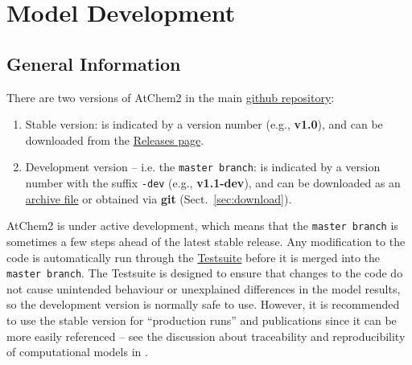 %
%
%
%

\chapter{Model Development} \label{ch:development}

\section{General Information} \label{sec:general-information}

There are two versions of AtChem2 in the main
\href{https://github.com/AtChem/AtChem2}{github repository}:

\begin{enumerate}
\item Stable version: is indicated by a version number (e.g.,
  \textbf{v1.0}), and can be downloaded from the
  \href{https://github.com/AtChem/AtChem2/releases}{Releases page}.
\item Development version -- i.e. the \texttt{master\ branch}: is
  indicated by a version number with the suffix \texttt{-dev} (e.g.,
  \textbf{v1.1-dev}), and can be downloaded as an
  \href{https://github.com/AtChem/AtChem2/archive/master.zip}{archive
    file} or obtained via \textbf{git} (Sect.~\ref{sec:download}).
\end{enumerate}

AtChem2 is under active development, which means that the
\texttt{master\ branch} is sometimes a few steps ahead of the latest
stable release. Any modification to the code is automatically run
through the \hyperref[sec:test-suite]{Testsuite} before it is merged
into the \texttt{master\ branch}. The Testsuite is designed to ensure
that changes to the code do not cause unintended behaviour or
unexplained differences in the model results, so the development
version is normally safe to use. However, it is recommended to use the
stable version for ``production runs'' and publications since it can
be more easily referenced -- see the discussion about traceability and
reproducibility of computational models in \citet{sommariva_2020}.

